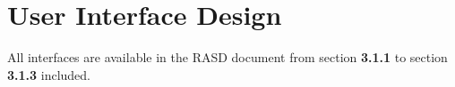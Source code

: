 \section{User Interface Design}
	All interfaces are available in the RASD document from section \textbf{3.1.1} to section \textbf{3.1.3} included.